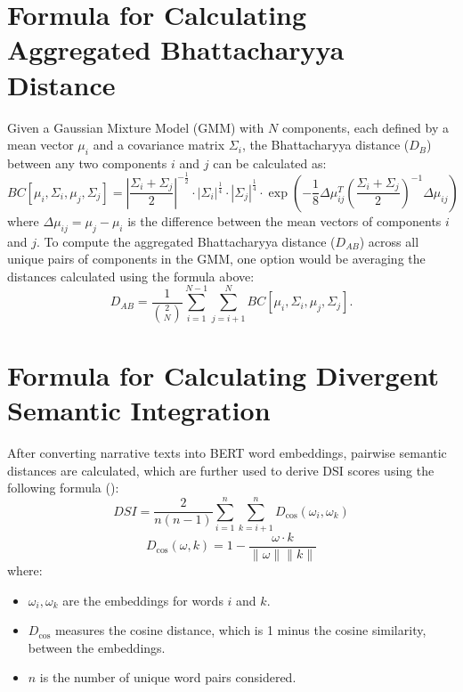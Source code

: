 \documentclass[../MA_Thesis.tex]{subfiles}
\begin{document}
\begin{appendix}
\section{Formula for Calculating Aggregated Bhattacharyya Distance}
\label{appendix: bhattacharyya distance}
Given a Gaussian Mixture Model (GMM) with $N$ components, each defined by a mean vector $\mu_i$ and a covariance matrix $\Sigma_i$, the Bhattacharyya distance ($D_B$) between any two components $i$ and $j$ can be calculated as:
    \begin{equation*}
        BC[\mu_i, \Sigma_i, \mu_j, \Sigma_j] = \left| \frac{\Sigma_i + \Sigma_j}{2} \right|^{-\frac{1}{2}} \cdot \left|\Sigma_i\right|^\frac{1}{4} \cdot \left|\Sigma_j\right|^\frac{1}{4} \cdot \exp\left( -\frac{1}{8} \Delta\mu_{ij}^T \left(\frac{\Sigma_i + \Sigma_j}{2}\right)^{-1} \Delta\mu_{ij} \right)
    \end{equation*}
    where $\Delta\mu_{ij} = \mu_j - \mu_i$ is the difference between the mean vectors of components $i$ and $j$. To compute the aggregated Bhattacharyya distance ($D_{AB}$) across all unique pairs of components in the GMM, one option would be averaging the distances calculated using the formula above:
    \begin{equation*}
        D_{AB} = \frac{1}{\binom{2}{N}} \sum_{i=1}^{N-1} \sum_{j=i+1}^{N} BC[\mu_i, \Sigma_i, \mu_j, \Sigma_j].
    \end{equation*}

\newpage
\section{Formula for Calculating Divergent Semantic Integration}
\label{appendix: DSI}
After converting narrative texts into BERT word embeddings, pairwise semantic distances are calculated, which are further used to derive DSI scores using the following formula (\cite{johnson_divergent_2022}):
\begin{equation*}
    DSI = \frac{2}{n(n-1)} \sum_{i=1}^{n} \sum_{k=i+1}^{n} D_{\text{cos}}(\omega_i, \omega_k)
\end{equation*}
\begin{equation*}
    D_{\text{cos}}(\omega, k) = 1 - \frac{\omega \cdot k}{\|\omega\| \|k\|}
\end{equation*}
where:
\begin{itemize}
    \item \(\omega_i, \omega_k\) are the embeddings for words \(i\) and \(k\).
    \item \(D_{\text{cos}}\) measures the cosine distance, which is 1 minus the cosine similarity, between the embeddings.
    \item \(n\) is the number of unique word pairs considered.
\end{itemize}


\end{appendix}
\end{document}
